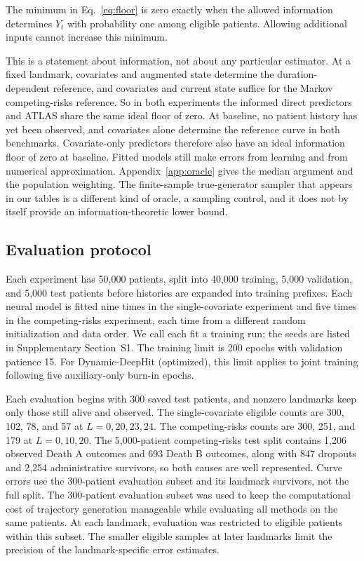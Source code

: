 \begin{proposition}\label{prop:floor}
The minimum in Eq.~\eqref{eq:floor} is zero exactly when the allowed information determines $Y_t$ with probability one among eligible patients. Allowing additional inputs cannot increase this minimum.
\end{proposition}
This is a statement about information, not about any particular estimator. At a fixed landmark, covariates and augmented state determine the duration-dependent reference, and covariates and current state suffice for the Markov competing-risks reference. So in both experiments the informed direct predictors and ATLAS share the same ideal floor of zero. At baseline, no patient history has yet been observed, and covariates alone determine the reference curve in both benchmarks. Covariate-only predictors therefore also have an ideal information floor of zero at baseline. Fitted models still make errors from learning and from numerical approximation. Appendix~\ref{app:oracle} gives the median argument and the population weighting. The finite-sample true-generator sampler that appears in our tables is a different kind of oracle, a sampling control, and it does not by itself provide an information-theoretic lower bound.

\subsection{Evaluation protocol}\label{sec:evaluation}
Each experiment has 50,000 patients, split into 40,000 training, 5,000 validation, and 5,000 test patients before histories are expanded into training prefixes. Each neural model is fitted nine times in the single-covariate experiment and five times in the competing-risks experiment, each time from a different random initialization and data order. We call each fit a training run; the seeds are listed in Supplementary Section~S1. The training limit is 200 epochs with validation patience 15. For Dynamic-DeepHit (optimized), this limit applies to joint training following five auxiliary-only burn-in epochs.

Each evaluation begins with 300 saved test patients, and nonzero landmarks keep only those still alive and observed. The single-covariate eligible counts are 300, 102, 78, and 57 at $L=0,20,23,24$. The competing-risks counts are 300, 251, and 179 at $L=0,10,20$. The 5,000-patient competing-risks test split contains 1,206 observed Death A outcomes and 693 Death B outcomes, along with 847 dropouts and 2,254 administrative survivors, so both causes are well represented. Curve errors use the 300-patient evaluation subset and its landmark survivors, not the full split. The 300-patient evaluation subset was used to keep the computational cost of trajectory generation manageable while evaluating all methods on the same patients. At each landmark, evaluation was restricted to eligible patients within this subset. The smaller eligible samples at later landmarks limit the precision of the landmark-specific error estimates.

